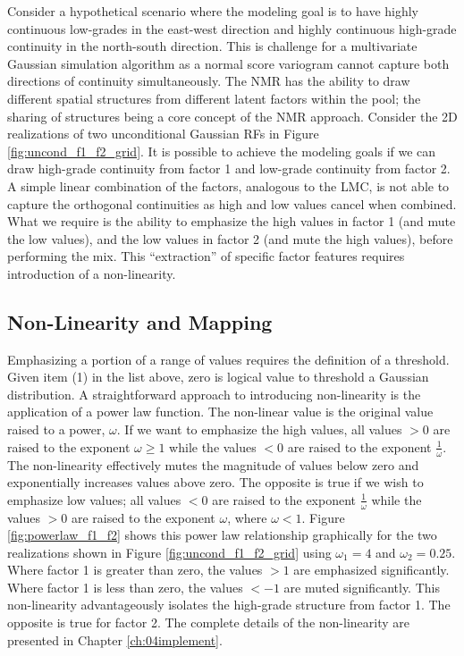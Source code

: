 Consider a hypothetical scenario where the modeling goal is to have highly continuous low-grades in the east-west direction and highly continuous high-grade continuity in the north-south direction. This is challenge for a multivariate Gaussian simulation algorithm as a normal score variogram cannot capture both directions of continuity simultaneously. The \gls{NMR} has the ability to draw different spatial structures from different latent factors within the pool; the sharing of structures being a core concept of the \gls{NMR} approach. Consider the \gls{2D} realizations of two unconditional Gaussian \glspl{RF} in Figure \ref{fig:uncond_f1_f2_grid}. It is possible to achieve the modeling goals if we can draw high-grade continuity from factor 1 and low-grade continuity from factor 2. A simple linear combination of the factors, analogous to the \gls{LMC}, is not able to capture the orthogonal continuities as high and low values cancel when combined. What we require is the ability to emphasize the high values in factor 1 (and mute the low values), and the low values in factor 2 (and mute the high values), before performing the mix. This ``extraction'' of specific factor features requires introduction of a non-linearity.


\FloatBarrier
\subsection{Non-Linearity and Mapping}
\label{subsec:03nonlinear}

Emphasizing a portion of a range of values requires the definition of a threshold. Given item (1) in the list above, zero is logical value to threshold a Gaussian distribution. A straightforward approach to introducing non-linearity is the application of a power law function. The non-linear value is the original value raised to a power, $\omega$. If we want to emphasize the high values, all values $> 0$ are raised to the exponent $\omega \geq 1$ while the values $< 0$ are raised to the exponent $\frac{1}{\omega}$. The non-linearity effectively mutes the magnitude of values below zero and exponentially increases values above zero. The opposite is true if we wish to emphasize low values; all values $< 0$ are raised to the exponent $\frac{1}{\omega}$ while the values $> 0$ are raised to the exponent $\omega$, where $\omega < 1$. Figure \ref{fig:powerlaw_f1_f2} shows this power law relationship graphically for the two realizations shown in Figure \ref{fig:uncond_f1_f2_grid} using $\omega_{1}=4$ and $\omega_{2}=0.25$. Where factor 1 is greater than zero, the values $> 1$ are emphasized significantly. Where factor 1 is less than zero, the values $< -1$ are muted significantly. This non-linearity advantageously isolates the high-grade structure from factor 1. The opposite is true for factor 2. The complete details of the non-linearity are presented in Chapter \ref{ch:04implement}.

